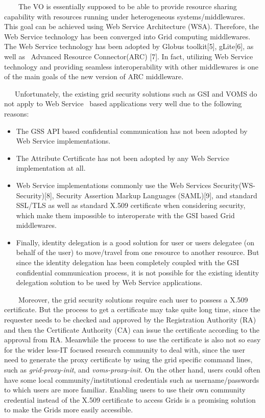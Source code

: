 \documentclass{article}
\newcommand\liststyleLiii{%
\renewcommand\labelitemi{${\bullet}$}
\renewcommand\labelitemii{${\circ}$}
\renewcommand\labelitemiii{${\blacksquare}$}
\renewcommand\labelitemiv{${\bullet}$}
}
\begin{document}
\ \ \ \ The VO is essentially supposed to be able to provide resource
sharing capability with resources running under heterogeneous
systems/middlewares. This goal can be achieved using Web Service
Architecture (WSA). Therefore, the Web Service technology has been
converged into Grid computing middlewares. The Web Service technology
has been adopted by Globus toolkit[5], gLite[6], as well as \ Advanced
Resource Connector(ARC) [7]. In fact, utilizing Web Service technology
and providing seamless interoperability with other middlewares is one
of the main goals of the new version of ARC middleware.

\ \ \ Unfortunately, the existing grid security solutions such as GSI
and VOMS do not apply to Web Service \ based applications very well due
to the following reasons:

\liststyleLiii
\begin{itemize}
\item The GSS API based confidential communication has not been adopted
by Web Service implementations.
\item The Attribute Certificate has not been adopted by any Web Service
implementation at all.
\item Web Service implementations commonly use the Web Services
Security(WS-Security)[8], Security Assertion Markup Languages
(SAML)[9], and standard SSL/TLS as well as standard X.509 certificate
when considering security, which make them impossible to interoperate
with the GSI based Grid middlewares.
\item Finally, identity delegation is a good solution for user or
user{\textquotesingle}s delegatee (on behalf of the user) to
move/travel from one resource to another resource. But since the
identity delegation has been completely coupled with the GSI
confidential communication process, it is not possible for the existing
identity delegation solution to be used by Web Service applications.
\end{itemize}
\ \ \ \ Moreover, the grid security solutions require each user to
possess a X.509 certificate. But the process to get a certificate may
take quite long time, since the requester needs to be checked and
approved by the Registration Authority (RA) and then the Certificate
Authority (CA) can issue the certificate according to the approval from
RA. Meanwhile the process to use the certificate is also not so easy
for the wider less-IT focused research community to deal with, since
the user need to generate the proxy certificate by using the grid
specific command lines, such as \textit{grid-proxy-init}, and
\textit{voms-proxy-init}. On the other hand, users could often have
some local community/institutional credentials such as
username/passwords to which users are more familiar. Enabling users to
use their own community credential instead of the X.509 certificate to
access Grids is a promising solution to make the Grids more easily
accessible. 
\end{document}
